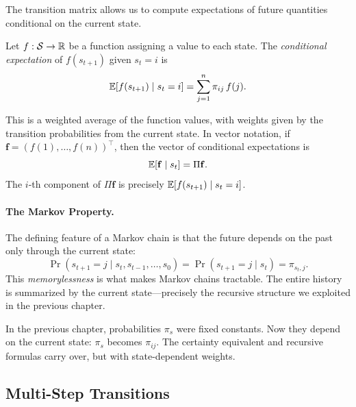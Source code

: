 The transition matrix allows us to compute expectations of future quantities conditional on the current state.

\begin{definition}
\label{def:conditional-expectation}
Let $f: \mathcal{S} \to \mathbb{R}$ be a function assigning a value to each state. The \emph{conditional expectation} of $f(s_{t+1})$ given $s_t = i$ is
\begin{equation}
\mathbb{E}[f(s_{t+1}) \mid s_t = i] = \sum_{j=1}^{n} \pi_{ij} \, f(j).
\label{eq:conditional-expectation}
\end{equation}
\end{definition}

This is a weighted average of the function values, with weights given by the transition probabilities from the current state. In vector notation, if $\mathbf{f} = (f(1), \ldots, f(n))^\top$, then the vector of conditional expectations is
\begin{equation}
\mathbb{E}[\mathbf{f} \mid s_t] = \Pi \mathbf{f}.
\label{eq:conditional-expectation-vector}
\end{equation}
The $i$-th component of $\Pi \mathbf{f}$ is precisely $\mathbb{E}[f(s_{t+1}) \mid s_t = i]$.

\paragraph{The Markov Property.}
The defining feature of a Markov chain is that the future depends on the past only through the current state:
\begin{equation}
\Pr(s_{t+1} = j \mid s_t, s_{t-1}, \ldots, s_0) = \Pr(s_{t+1} = j \mid s_t) = \pi_{s_t, j}.
\label{eq:markov-property}
\end{equation}
This \emph{memorylessness} is what makes Markov chains tractable. The entire history is summarized by the current state---precisely the recursive structure we exploited in the previous chapter.

\begin{calloutimportant}
In the previous chapter, probabilities $\pi_s$ were fixed constants. Now they depend on the current state: $\pi_s$ becomes $\pi_{ij}$. The certainty equivalent and recursive formulas carry over, but with state-dependent weights.
\end{calloutimportant}

\subsection{Multi-Step Transitions}
\label{subsec:multi-step}

